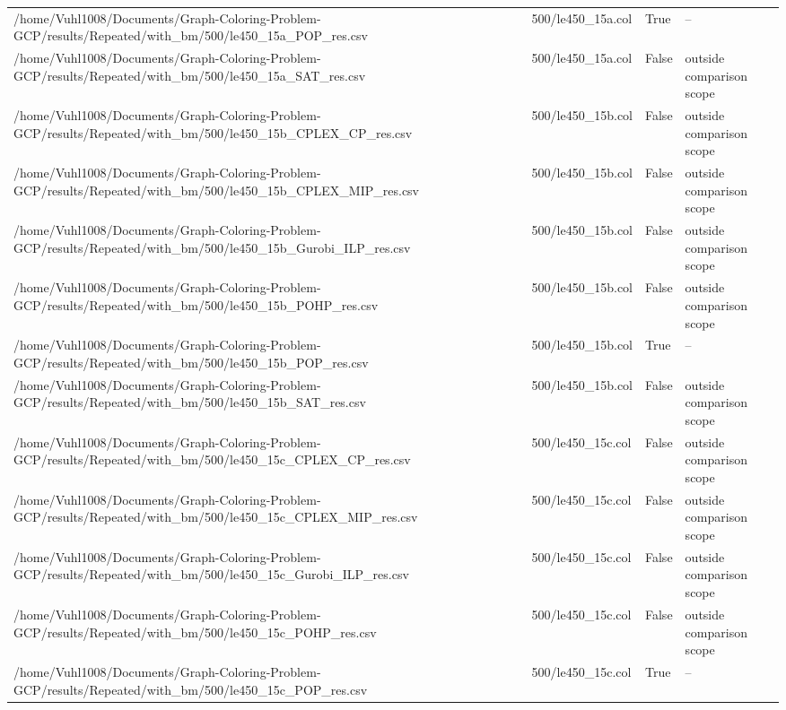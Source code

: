 \begin{table}[htbp]
\begin{tabular}{llll}
/home/Vuhl1008/Documents/Graph-Coloring-Problem-GCP/results/Repeated/with\_bm/500/le450\_15a\_POP\_res.csv & 500/le450\_15a.col & True & -- \\
/home/Vuhl1008/Documents/Graph-Coloring-Problem-GCP/results/Repeated/with\_bm/500/le450\_15a\_SAT\_res.csv & 500/le450\_15a.col & False & outside comparison scope \\
/home/Vuhl1008/Documents/Graph-Coloring-Problem-GCP/results/Repeated/with\_bm/500/le450\_15b\_CPLEX\_CP\_res.csv & 500/le450\_15b.col & False & outside comparison scope \\
/home/Vuhl1008/Documents/Graph-Coloring-Problem-GCP/results/Repeated/with\_bm/500/le450\_15b\_CPLEX\_MIP\_res.csv & 500/le450\_15b.col & False & outside comparison scope \\
/home/Vuhl1008/Documents/Graph-Coloring-Problem-GCP/results/Repeated/with\_bm/500/le450\_15b\_Gurobi\_ILP\_res.csv & 500/le450\_15b.col & False & outside comparison scope \\
/home/Vuhl1008/Documents/Graph-Coloring-Problem-GCP/results/Repeated/with\_bm/500/le450\_15b\_POHP\_res.csv & 500/le450\_15b.col & False & outside comparison scope \\
/home/Vuhl1008/Documents/Graph-Coloring-Problem-GCP/results/Repeated/with\_bm/500/le450\_15b\_POP\_res.csv & 500/le450\_15b.col & True & -- \\
/home/Vuhl1008/Documents/Graph-Coloring-Problem-GCP/results/Repeated/with\_bm/500/le450\_15b\_SAT\_res.csv & 500/le450\_15b.col & False & outside comparison scope \\
/home/Vuhl1008/Documents/Graph-Coloring-Problem-GCP/results/Repeated/with\_bm/500/le450\_15c\_CPLEX\_CP\_res.csv & 500/le450\_15c.col & False & outside comparison scope \\
/home/Vuhl1008/Documents/Graph-Coloring-Problem-GCP/results/Repeated/with\_bm/500/le450\_15c\_CPLEX\_MIP\_res.csv & 500/le450\_15c.col & False & outside comparison scope \\
/home/Vuhl1008/Documents/Graph-Coloring-Problem-GCP/results/Repeated/with\_bm/500/le450\_15c\_Gurobi\_ILP\_res.csv & 500/le450\_15c.col & False & outside comparison scope \\
/home/Vuhl1008/Documents/Graph-Coloring-Problem-GCP/results/Repeated/with\_bm/500/le450\_15c\_POHP\_res.csv & 500/le450\_15c.col & False & outside comparison scope \\
/home/Vuhl1008/Documents/Graph-Coloring-Problem-GCP/results/Repeated/with\_bm/500/le450\_15c\_POP\_res.csv & 500/le450\_15c.col & True & -- \\

\end{tabular}
\end{table}
